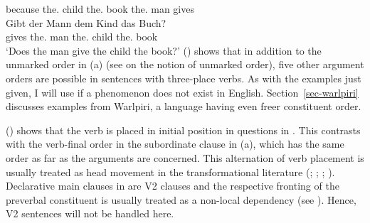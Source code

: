 \documentclass[output=paper
                ,modfonts
                ,nonflat
	        ,collection
	        ,collectionchapter
	        ,collectiontoclongg
 	        ,biblatex
                ,babelshorthands
                ,newtxmath
                ,draftmode
                ,colorlinks, citecolor=brown
]{./langsci/langscibook}
\begin{document}
     \spacebr{}because the.\DAT{} child the.\ACC{} book the.\NOM{} man  gives\\
\zl
\ea
\gll Gibt der Mann dem Kind das Buch?\\
     gives the.\NOM{} man the.\DAT{} child the.\ACC{} book\\
\glt `Does the man give the child the book?'
\z
() shows that in addition to the unmarked order in (a) (see  on the
notion of unmarked order), five other argument orders are possible in sentences with three-place
verbs. As with the examples just given, I will use  if a phenomenon does not exist in
English. Section~\ref{sec-warlpiri} discusses examples from Warlpiri, a language having even freer constituent order.

() shows that the verb is placed in initial position in questions in . This contrasts
with the verb-final order in the subordinate clause in (a), which has the same order as far
as the arguments are concerned. This alternation of verb placement is usually treated as
head movement in the transformational literature (\citealp{Bach62a}; \citealp*[]{Bierwisch63a};
\citealp{Reis74a}; \citealp[Chapter~1]{Thiersch78a}). Declarative main clauses in  are V2
clauses and the respective fronting of the preverbal constituent is usually treated as a non-local dependency (see
). Hence, V2 sentences will not be handled here.
\end{document}
